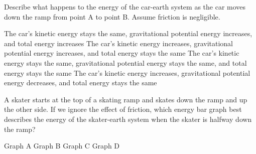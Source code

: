 \documentclass[answers]{exam}
\begin{document}
\begin{questions}

\question
Describe what happens to the energy of the car-earth system as the car moves down the ramp from point A to point B. Assume friction is negligible. 

\begin{center}
\end{center}

\begin{randomizechoices}[norandomize]
    \choice The car's kinetic energy stays the same, gravitational potential energy increases, and total energy increases
    \choice The car's kinetic energy increases, gravitational potential energy increases, and total energy stays the same
    \choice The car's kinetic energy stays the same, gravitational potential energy stays the same, and total energy stays the same
    \correctchoice The car's kinetic energy increases, gravitational potential energy decreases, and total energy stays the same
\end{randomizechoices}

\question
A skater starts at the top of a skating ramp and skates down the ramp and up the other side. If we ignore the effect of friction, which energy bar graph best describes the energy of the skater-earth system when the skater is halfway down the ramp?

\begin{minipage}{0.6\textwidth}
    \centering
\end{minipage}%
\begin{minipage}{0.35\textwidth}
    \centering
    \begin{randomizechoices}[norandomize]
        \choice Graph A
        \correctchoice Graph B
        \choice Graph C
        \choice Graph D
    \end{randomizechoices}    
\end{minipage}%


\end{questions}
\end{document}
